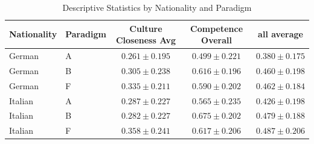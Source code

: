 \begin{table}
\caption{Descriptive Statistics by Nationality and Paradigm}
\label{tab:nat_desc_stats}
\begin{tabular}{llccc}
\toprule
Nationality & Paradigm & Culture Closeness Avg & Competence Overall & all average \\
\midrule
German & A & $0.261 \pm 0.195$ & $0.499 \pm 0.221$ & $0.380 \pm 0.175$ \\
German & B & $0.305 \pm 0.238$ & $0.616 \pm 0.196$ & $0.460 \pm 0.198$ \\
German & F & $0.335 \pm 0.211$ & $0.590 \pm 0.202$ & $0.462 \pm 0.184$ \\
Italian & A & $0.287 \pm 0.227$ & $0.565 \pm 0.235$ & $0.426 \pm 0.198$ \\
Italian & B & $0.282 \pm 0.227$ & $0.675 \pm 0.202$ & $0.479 \pm 0.188$ \\
Italian & F & $0.358 \pm 0.241$ & $0.617 \pm 0.206$ & $0.487 \pm 0.206$ \\
\bottomrule
\end{tabular}
\end{table}
